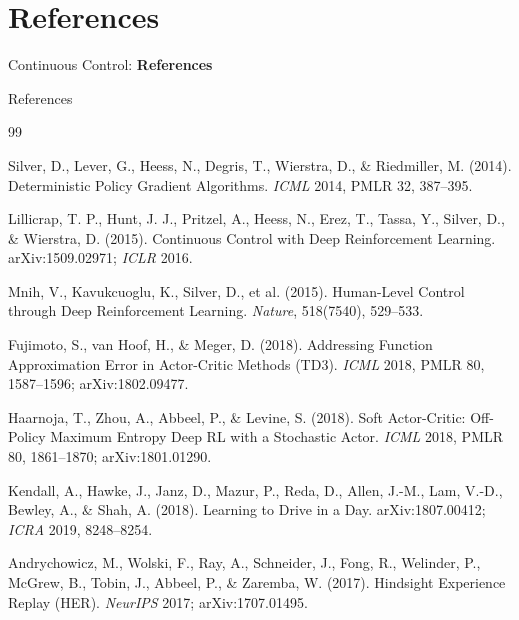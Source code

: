 \section{References}
\begin{frame}{}
    \LARGE Continuous Control: \textbf{References}
\end{frame}

\begin{frame}[allowframebreaks]{References}
\footnotesize
\begin{thebibliography}{99}

\hypertarget{ref:1}{}
Silver, D., Lever, G., Heess, N., Degris, T., Wierstra, D., \& Riedmiller, M. (2014).
\newblock Deterministic Policy Gradient Algorithms.
\newblock \emph{ICML} 2014, PMLR 32, 387--395.

\hypertarget{ref:2}{}
Lillicrap, T. P., Hunt, J. J., Pritzel, A., Heess, N., Erez, T., Tassa, Y., Silver, D., \& Wierstra, D. (2015).
\newblock Continuous Control with Deep Reinforcement Learning.
\newblock arXiv:1509.02971; \emph{ICLR} 2016.

\hypertarget{ref:3}{}
Mnih, V., Kavukcuoglu, K., Silver, D., et al. (2015).
\newblock Human-Level Control through Deep Reinforcement Learning.
\newblock \emph{Nature}, 518(7540), 529--533.

\hypertarget{ref:4}{}
Fujimoto, S., van Hoof, H., \& Meger, D. (2018).
\newblock Addressing Function Approximation Error in Actor-Critic Methods (TD3).
\newblock \emph{ICML} 2018, PMLR 80, 1587--1596; arXiv:1802.09477.

\hypertarget{ref:5}{}
Haarnoja, T., Zhou, A., Abbeel, P., \& Levine, S. (2018).
\newblock Soft Actor-Critic: Off-Policy Maximum Entropy Deep RL with a Stochastic Actor.
\newblock \emph{ICML} 2018, PMLR 80, 1861--1870; arXiv:1801.01290.

\hypertarget{ref:6}{}
Kendall, A., Hawke, J., Janz, D., Mazur, P., Reda, D., Allen, J.-M., Lam, V.-D., Bewley, A., \& Shah, A. (2018).
\newblock Learning to Drive in a Day.
\newblock arXiv:1807.00412; \emph{ICRA} 2019, 8248--8254.

\hypertarget{ref:7}{}
Andrychowicz, M., Wolski, F., Ray, A., Schneider, J., Fong, R., Welinder, P., McGrew, B., Tobin, J., Abbeel, P., \& Zaremba, W. (2017).
\newblock Hindsight Experience Replay (HER).
\newblock \emph{NeurIPS} 2017; arXiv:1707.01495.


\end{thebibliography}
\end{frame}
